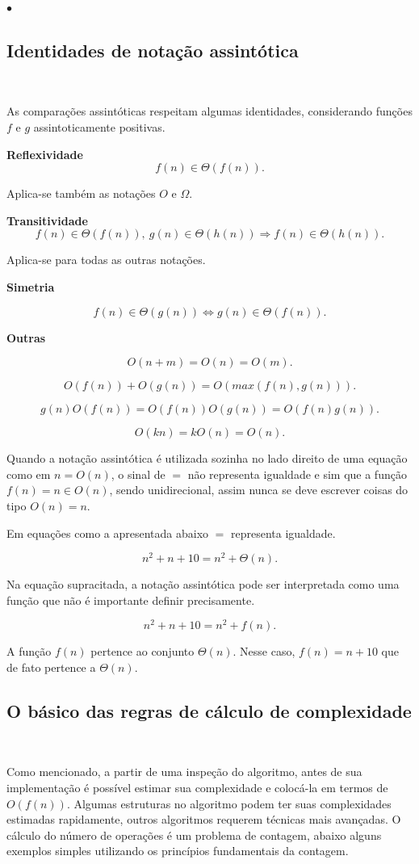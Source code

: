 {\raggedleft $\bullet$ \par}

\subsection{Identidades de notação assintótica}
\

As comparações assintóticas respeitam algumas identidades, considerando funções $f$ e $g$ assintoticamente positivas.

\textbf{Reflexividade}
\[f(n)\in\Theta(f(n)).\]

Aplica-se também as notações $O$ e $\Omega$.

\textbf{Transitividade}
\[f(n)\in\Theta(f(n)), \ g(n)\in\Theta(h(n)) \Rightarrow f(n)\in\Theta(h(n)).\]

Aplica-se para todas as outras notações.

\textbf{Simetria}

\[f(n)\in\Theta(g(n)) \Leftrightarrow g(n)\in\Theta(f(n)).\]

\textbf{Outras}

\[O(n+m)=O(n)=O(m).\]

\[O(f(n)) + O(g(n)) = O(max(f(n),g(n))).\]

\[g(n)O(f(n)) = O(f(n))O(g(n)) = O(f(n)g(n)).\]

\[O(kn)=kO(n)=O(n).\]

Quando a notação assintótica é utilizada sozinha no lado direito de uma equação como em $n=O(n)$, o sinal de $=$ não representa igualdade e sim que a função $f(n)=n\in O(n)$, sendo unidirecional, assim nunca se deve escrever coisas do tipo $O(n)=n$.

Em equações como a apresentada abaixo $=$ representa igualdade.

\[n^2+n+10=n^2+\Theta(n).\]

Na equação supracitada, a notação assintótica pode ser interpretada como uma função que não é importante definir precisamente.

\[n^2+n+10=n^2+f(n).\]

A função $f(n)$ pertence ao conjunto $\Theta(n)$. Nesse caso, $f(n)=n+10$ que de fato pertence a $\Theta(n)$.

\subsection{O básico das regras de cálculo de complexidade}
\

Como mencionado, a partir de uma inspeção do algoritmo, antes de sua implementação é possível estimar sua complexidade e colocá-la em termos de $O(f(n))$. Algumas estruturas no algoritmo podem ter suas complexidades estimadas rapidamente, outros algoritmos requerem técnicas mais avançadas. O cálculo do número de operações é um problema de contagem, abaixo alguns exemplos simples utilizando os princípios fundamentais da contagem.


